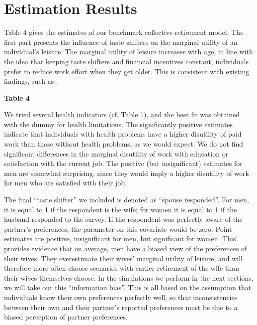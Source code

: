 \documentclass[11pt,letter]{article}
\begin{document}
\section{Estimation Results}

\par Table 4 gives the estimates of our benchmark collective retirement model. The first part presents the influence of taste shifters on the marginal utility of an individual's leisure. The marginal utility of leisure increases with age, in line with the idea that keeping taste shifters and financial incentives constant, individuals prefer to reduce work effort when they get older. This is consistent with existing findings, such as \citet{michaud2011}.

\begin{center}
\textbf{Table 4}
\end{center}

We tried several health indicators (cf. Table 1), and the best fit was obtained with the dummy for health limitations. The significantly positive estimates indicate that individuals with health problems have a higher disutility of paid work than those without health problems, as we would expect. We do not find significant differences in the marginal disutility of work with education or satisfaction with the current job. The positive (but insignificant) estimates for men are somewhat surprising, since they would imply a higher disutility of work for men who are satisfied with their job.

The final ``taste shifter'' we included is denoted as ``spouse responded''. For men, it is equal to 1 if the respondent is the wife; for women it is equal to 1 if the husband responded to the survey. If the respondent was perfectly aware of the partner's preferences, the parameter on this covariate would be zero. Point estimates are positive, insignificant for men, but significant for women. This provides evidence that on average, men have a biased view of the preferences of their wives. They overestimate their wives' marginal utility of leisure, and will therefore more often choose scenarios with earlier retirement of the wife than their wives themselves choose. In the simulations we perform in the next sections, we will take out this ``information bias''. This is all based on the assumption that individuals know their own preferences perfectly well, so that inconsistencies between their own and their partner's reported preferences must be due to a biased perception of partner preferences.
\end{document}
